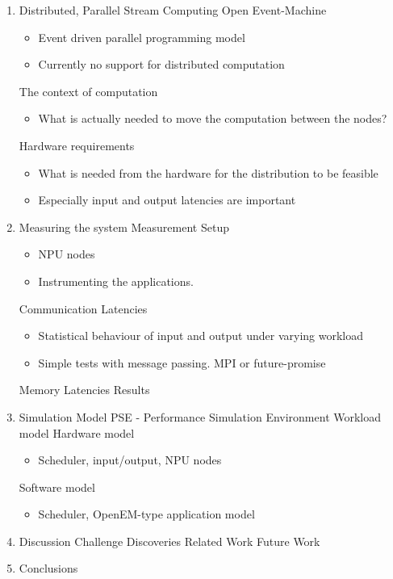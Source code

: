 \begin{enumerate}
\item Distributed, Parallel Stream Computing
  \subitem Open Event-Machine
  \begin{itemize}[leftmargin=45px]
    \item Event driven parallel programming model
    \item Currently no support for distributed computation
  \end{itemize}
  \subitem The context of computation
  \begin{itemize}[leftmargin=45px]
    \item What is actually needed to move the computation between the nodes?
  \end{itemize}
  \subitem Hardware requirements
  \begin{itemize}[leftmargin=45px]
    \item What is needed from the hardware for the distribution to be feasible
    \item Especially input and output latencies are important
  \end{itemize}

\item Measuring the system
  \subitem Measurement Setup
  \begin{itemize}[leftmargin=45px]
    \item NPU nodes
    \item Instrumenting the applications.
  \end{itemize}
  \subitem Communication Latencies
  \begin{itemize}[leftmargin=45px]
    \item Statistical behaviour of input and output under varying workload
    \item Simple tests with message passing. MPI or future-promise
  \end{itemize}
  \subitem Memory Latencies
  \subitem Results

\item Simulation Model
  \subitem PSE - Performance Simulation Environment
  \subitem Workload model
  \subitem Hardware model
  \begin{itemize}[leftmargin=45px]
    \item Scheduler, input/output, NPU nodes
  \end{itemize}
  \subitem Software model
  \begin{itemize}[leftmargin=45px]
    \item Scheduler, OpenEM-type application model
  \end{itemize}

\item Discussion
  \subitem Challenge
  \subitem Discoveries
  \subitem Related Work
  \subitem Future Work

\item Conclusions
\end{enumerate}


